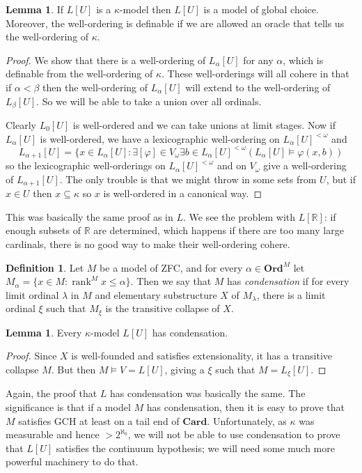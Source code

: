 \documentclass[12pt]{report}
\newcommand{\RR}{\mathbb{R}}
\newcommand{\rank}{\operatorname{rank}}
\newcommand{\Card}{\mathbf{Card}}
\newcommand{\Ord}{\mathbf{Ord}}
\newcommand{\dfn}[1]{\emph{#1}\index{#1}}
\theoremstyle{definition}
\newtheorem{lemma}[theorem]{Lemma}
\newtheorem{definition}[theorem]{Definition}
\begin{document}
\begin{lemma}
If $L[U]$ is a $\kappa$-model then $L[U]$ is a model of global choice.
Moreover, the well-ordering is definable if we are allowed an oracle that tells us the well-ordering of $\kappa$.
\end{lemma}
\begin{proof}
We show that there is a well-ordering of $L_\alpha[U]$ for any $\alpha$, which is definable from the well-ordering of $\kappa$.
These well-orderings will all cohere in that if $\alpha < \beta$ then the well-ordering of $L_\alpha[U]$ will extend to the well-ordering of $L_\beta[U]$. So we will be able to take a union over all ordinals.

Clearly $L_0[U]$ is well-ordered and we can take unions at limit stages. Now if $L_\alpha[U]$ is well-ordered, we have a lexicographic well-ordering on $L_\alpha[U]^{<\omega}$ and
$$L_{\alpha+1}[U] = \{x \in L_\alpha[U]: \exists [\varphi] \in V_\omega \exists b \in L_\alpha[U]^{<\omega}(L_\alpha[U] \models \varphi(x, b))$$
so the lexicographic well-orderings on $L_\alpha[U]^{<\omega}$ and on $V_\omega$ give a well-ordering of $L_{\alpha+1}[U]$.
The only trouble is that we might throw in some sets from $U$, but if $x \in U$ then $x \subseteq \kappa$ so $x$ is well-ordered in a canonical way.
\end{proof}
This was basically the same proof as in $L$. We see the problem with $L[\RR]$: if enough subsets of $\RR$ are determined, which happens if there are too many large cardinals, there is no good way to make their well-ordering cohere.

\begin{definition}
Let $M$ be a model of ZFC, and for every $\alpha \in \Ord^M$ let $M_\alpha = \{x \in M: \rank^M x \leq \alpha\}$.
Then we say that $M$ has \dfn{condensation} if for every limit ordinal $\lambda$ in $M$ and elementary substructure $X$ of $M_\lambda$, there is a limit ordinal $\xi$ such that $M_\xi$ is the transitive collapse of $X$.
\end{definition}

\begin{lemma}
Every $\kappa$-model $L[U]$ has condensation.
\end{lemma}
\begin{proof}
Since $X$ is well-founded and satisfies extensionality, it has a transitive collapse $M$. But then $M \models V = L[U]$, giving a $\xi$ such that $M = L_\xi[U]$.
\end{proof}
Again, the proof that $L$ has condensation was basically the same.
The significance is that if a model $M$ has condensation, then it is easy to prove that $M$ satisfies GCH at least on a tail end of $\Card$.
Unfortunately, as $\kappa$ was measurable and hence $> 2^{\aleph_0}$, we will not be able to use condensation to prove that $L[U]$ satisfies the continuum hypothesis; we will need some much more powerful machinery to do that.
\end{document}

